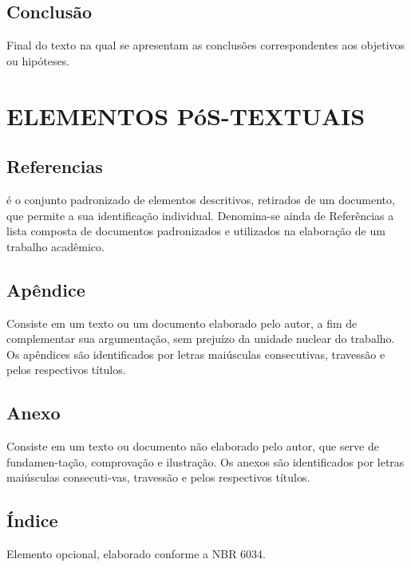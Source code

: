 \subsection{Conclusão}

Final do texto na qual se apresentam as conclusões correspondentes aos objetivos ou hip\'{o}teses.

\section{ELEMENTOS P\'{o}S-TEXTUAIS}

\subsection{Referencias}

\'{e} o conjunto padronizado de elementos descritivos, retirados de
um documento, que permite a sua identifica\c{c}ão individual. Denomina-se ainda de Refer\^{e}ncias a lista composta de documentos padronizados e utilizados na elabora\c{c}ão de um trabalho acad\^{e}mico.

\subsection{Ap\^{e}ndice}

Consiste em um texto ou um documento elaborado pelo autor, a fim
de complementar sua argumenta\c{c}ão, sem prejuízo da unidade nuclear do trabalho. Os ap\^{e}ndices são identificados por letras maiúsculas consecutivas, travessão e pelos respectivos títulos.

\subsection{Anexo}

Consiste em um texto ou documento não elaborado pelo autor, que
serve de fundamen-ta\c{c}ão, comprova\c{c}ão e ilustra\c{c}ão. Os anexos são identificados por letras maiúsculas consecuti-vas, travessão e pelos respectivos títulos.

\subsection{Índice}

Elemento opcional, elaborado conforme a NBR 6034.

